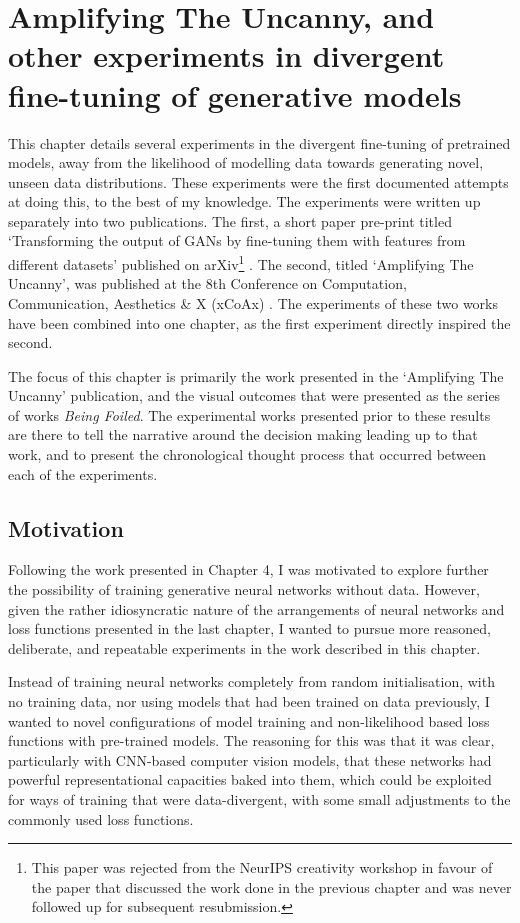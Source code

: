 \chapter{Amplifying The Uncanny, and other experiments in divergent fine-tuning of generative models}
\label{ch:uncanny}

This chapter details several experiments in the divergent fine-tuning of pretrained models, away from the likelihood of modelling data towards generating novel, unseen data distributions. 
These experiments were the first documented attempts at doing this, to the best of my knowledge. 
The experiments were written up separately into two publications. 
The first, a short paper pre-print titled `Transforming the output of GANs by fine-tuning them with features from different datasets’ published on arXiv\footnote{
    This paper was rejected from the NeurIPS creativity workshop in favour of the paper that discussed the work done in the previous chapter \citep{broad2019searching} and was never followed up for subsequent resubmission.} \citep{broad2019transforming}. 
The second, titled `Amplifying The Uncanny’, was published at the 8th Conference on Computation, Communication, Aesthetics \& X (xCoAx) \citep{broad2020amplifying}. 
The experiments of these two works have been combined into one chapter, as the first experiment directly inspired the second.

The focus of this chapter is primarily the work presented in the `Amplifying The Uncanny’ publication, and the visual outcomes that were presented as the series of works \textit{Being Foiled}. 
The experimental works presented prior to these results are there to tell the narrative around the decision making leading up to that work, and to present the chronological thought process that occurred between each of the experiments. 

\section{Motivation}

Following the work presented in Chapter 4, I was motivated to explore further the possibility of training generative neural networks without data. 
However, given the rather idiosyncratic nature of the arrangements of neural networks and loss functions presented in the last chapter, I wanted to pursue more reasoned, deliberate, and repeatable experiments in the work described in this chapter. 

Instead of training neural networks completely from random initialisation, with no training data, nor using models that had been trained on data previously, I wanted to novel configurations of model training and non-likelihood based loss functions with pre-trained models. 
The reasoning for this was that it was clear, particularly with CNN-based computer vision models, that these networks had powerful representational capacities baked into them, which could be exploited for ways of training that were data-divergent, with some small adjustments to the commonly used loss functions. 

